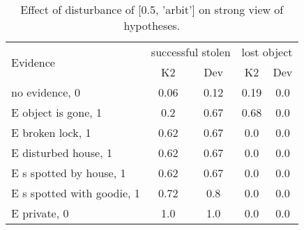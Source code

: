 \begin{table}\begin{tabular}{l|cc|cc}\toprule\multirow{2}{*}{Evidence} & \multicolumn{2}{c}{successful stolen}& \multicolumn{2}{c}{lost object}\\& {K2} & {Dev}& {K2} & {Dev}\\\midrule
no evidence, 0 & \cellcolor{Bittersweet}0.06&\cellcolor{Bittersweet}0.12&\cellcolor{Bittersweet}0.19&\cellcolor{Bittersweet}0.0\\E object is gone, 1 & \cellcolor{Bittersweet}0.2&\cellcolor{Bittersweet}0.67&\cellcolor{Bittersweet}0.68&\cellcolor{Bittersweet}0.0\\E broken lock, 1 & \cellcolor{Bittersweet}0.62&\cellcolor{Bittersweet}0.67&0.0&0.0\\E disturbed house, 1 & \cellcolor{Bittersweet}0.62&\cellcolor{Bittersweet}0.67&0.0&0.0\\E s spotted by house, 1 & \cellcolor{Bittersweet}0.62&\cellcolor{Bittersweet}0.67&0.0&0.0\\E s spotted with goodie, 1 & \cellcolor{Bittersweet}0.72&\cellcolor{Bittersweet}0.8&0.0&0.0\\E private, 0 & 1.0&1.0&0.0&0.0\\\bottomrule\end{tabular}\caption{Effect of disturbance of [0.5, 'arbit'] on strong view of hypotheses.}\end{table}